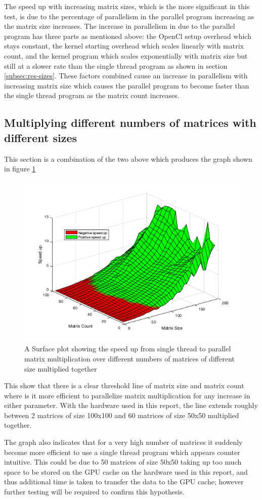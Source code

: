 The speed up with increasing matrix sizes, which is the more significant in this test, is due to the percentage of parallelism in the parallel program increasing as the matrix size increases.
The increase in parallelism in due to the parallel program has three parts as mentioned above: the OpenCl setup overhead which stays constant, the kernel starting overhead which scales linearly with matrix count, and the kernel program which scales exponentially with matrix size but still at a slower rate than the single thread program as shown in section \ref{subsec:res-sizes}.
These factors combined cause an increase in parallelism with increasing matrix size which causes the parallel program to become faster than the single thread program as the matrix count increases.


\subsection{Multiplying different numbers of matrices with different sizes}
This section is a combination of the two above which produces the graph shown in figure \ref{fig:2d}

\begin{figure}[H]
    \centering
    \includegraphics[width=1\columnwidth]{Figures/speedupsurf}
    \caption{A Surface plot showing the speed up from single thread to parallel matrix multiplication over different numbers of matrices of different size multiplied together}
    \label{fig:2d}
\end{figure}

This show that there is a clear threshold line of matrix size and matrix count where is it more efficient to parallelize matrix multiplication for any increase in either parameter.
With the hardware used in this report, the line extends roughly between 2 matrices of size 100x100 and 60 matrices of size 50x50 multiplied together.


The graph also indicates that for a very high number of matrices it suddenly become more efficient to use a single thread program which appears counter intuitive.
This could be due to 50 matrices of size 50x50 taking up too much space to be stored on the GPU cache on the hardware used in this report, and thus additional time is taken to transfer the data to the GPU cache; however further testing will be required to confirm this hypothesis.